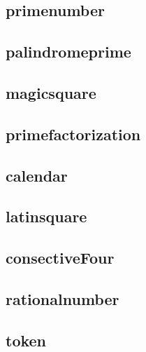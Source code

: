     \subsection{primenumber}
        
    \subsection{palindromeprime}
        
    \subsection{magicsquare}
        
    \subsection{primefactorization}
        
    \subsection{calendar}
        
    \subsection{latinsquare}
        
    \subsection{consectiveFour}
        
    \subsection{rationalnumber}
        
    \subsection{token}
        
        
        